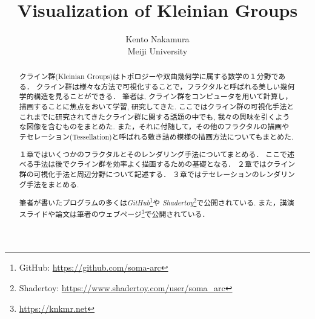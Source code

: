 \documentclass[uplatex, dvipdfmx]{jsarticle}
\title{ Visualization of Kleinian Groups }
\author{ Kento Nakamura\\
Meiji University\\
}
\date{}
\begin{document}
\maketitle

\begin{abstract}
クライン群(Kleinian Groups)はトポロジーや双曲幾何学に属する数学の１分野である．
クライン群は様々な方法で可視化することで，フラクタルと呼ばれる美しい幾何学的構造を見ることができる．
筆者は, クライン群をコンピュータを用いて計算し，描画することに焦点をおいて学習, 研究してきた.
ここではクライン群の可視化手法とこれまでに研究されてきたクライン群に関する話題の中でも, 我々の興味を引くような図像を含むものをまとめた.
また，それに付随して，その他のフラクタルの描画やテセレーション(Tessellation)と呼ばれる敷き詰め模様の描画方法についてもまとめた.

１章ではいくつかのフラクタルとそのレンダリング手法についてまとめる．
ここで述べる手法は後でクライン群を効率よく描画するための基礎となる．
２章ではクライン群の可視化手法と周辺分野について記述する．
３章ではテセレーションのレンダリング手法をまとめる.

筆者が書いたプログラムの多くは\textit{GitHub}\footnote{GitHub: \url{https://github.com/soma-arc}}や
\textit{Shadertoy}\footnote{Shadertoy: \url{https://www.shadertoy.com/user/soma\_arc}}で公開されている.
また，講演スライドや論文は筆者のウェブページ\footnote{\url{https://knkmr.net}}で公開されている．

\end{abstract}

\clearpage

\tableofcontents

\clearpage







\printbibliography
\end{document}
